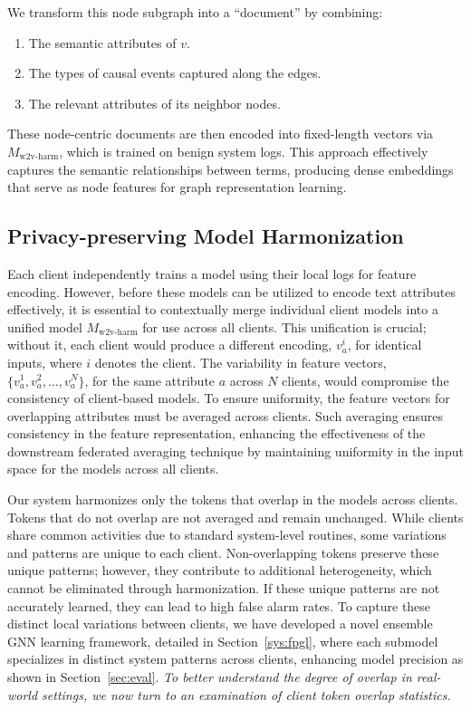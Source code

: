 We transform this node subgraph into a ``document'' by combining:
\begin{enumerate}
    \item The semantic attributes of \(v\).
    \item The types of causal events captured along the edges.
    \item The relevant attributes of its neighbor nodes.
\end{enumerate}

These node-centric documents are then encoded into fixed-length vectors via \(M_{\text{w2v-harm}}\), which is trained on benign system logs. This approach effectively captures the semantic relationships between terms, producing dense embeddings that serve as node features for graph representation learning.

\subsection{Privacy-preserving \wordvec Model Harmonization}
\label{sub:model:harmonization}
Each client independently trains a \wordvec model using their local logs for feature encoding. However, before these models can be utilized to encode text attributes effectively, it is essential to contextually merge individual client \wordvec models into a unified model \( M_{\text{w2v-harm}} \) for use across all clients. This unification is crucial; without it, each client would produce a different encoding, \(v_a^i\), for identical inputs, where \(i\) denotes the client. The variability in feature vectors, \(\{v_a^1, v_a^2, \ldots, v_a^N\}\), for the same attribute \(a\) across \(N\) clients, would compromise the consistency of client-based \gnnshort models. To ensure uniformity, the feature vectors for overlapping attributes must be averaged across clients. Such averaging ensures consistency in the feature representation, enhancing the effectiveness of the downstream federated averaging technique by maintaining uniformity in the input space for the \gnnshort models across all clients.

Our system harmonizes only the tokens that overlap in the \wordvec models across clients. Tokens that do not overlap are not averaged and remain unchanged. While clients share common activities due to standard system-level routines, some variations and patterns are unique to each client. Non-overlapping tokens preserve these unique patterns; however, they contribute to additional heterogeneity, which cannot be eliminated through harmonization. If these unique patterns are not accurately learned, they can lead to high false alarm rates. To capture these distinct local variations between clients, we have developed a novel ensemble GNN learning framework, detailed in Section~\ref{sys:fpgl}, where each submodel specializes in distinct system patterns across clients, enhancing model precision as shown in Section~\ref{sec:eval}.
\emph{To better understand the degree of overlap in real-world settings, we now turn to an examination of client token overlap statistics.}

